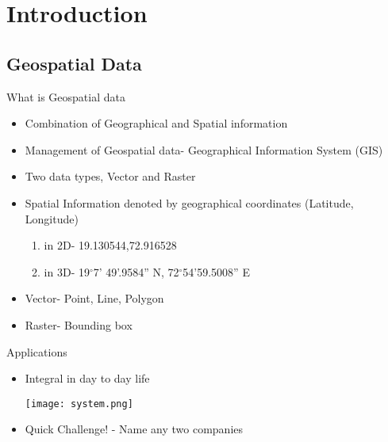 \section[Introduction]{Introduction}
\subsection[Geospatial Data]{Geospatial Data}



\begin{frame}{What is Geospatial data}
	\begin{beamerboxesrounded}{}
		\begin{itemize}
			\item Combination of Geographical and Spatial information 
			\item Management of Geospatial data- Geographical Information System (GIS)
			\item Two data types, Vector and Raster 
			\item Spatial Information denoted by geographical coordinates (Latitude, Longitude) 
			\begin{enumerate}
				\item in 2D- 19.130544,72.916528
				\item in 3D- 19$^{\circ}$7' 49'.9584'' N, 72$^{\circ}$54'59.5008'' E
			\end{enumerate}
			
			\item Vector- Point, Line, Polygon
			\item Raster- Bounding box
		\end{itemize}
	\end{beamerboxesrounded}
\end{frame}





\begin{frame}{Applications}
	\begin{beamerboxesrounded}{}
		\begin{itemize}
			\item Integral in day to day life
			
			{\centering
			\texttt{[image: system.png]} }
			
			\item Quick Challenge! - Name any two companies 
		\end{itemize}
	\end{beamerboxesrounded}
\end{frame}



